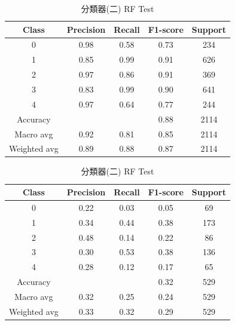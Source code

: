 \begin{enumerate}
\begin{enumerate}
                \begin{table}[H]
                \centering
                \scriptsize
                \begin{minipage}{0.48\textwidth}
                \centering
                \begin{tabular}{c|cccc}
                \hline
                Class & Precision & Recall & F1-score & Support \\
                \hline
                0 & 0.98 & 0.58 & 0.73 & 234 \\
                1 & 0.85 & 0.99 & 0.91 & 626 \\
                2 & 0.97 & 0.86 & 0.91 & 369 \\
                3 & 0.83 & 0.99 & 0.90 & 641 \\
                4 & 0.97 & 0.64 & 0.77 & 244 \\
                \hline
                Accuracy &       &       & 0.88 & 2114 \\
                Macro avg & 0.92 & 0.81 & 0.85 & 2114 \\
                Weighted avg & 0.89 & 0.88 & 0.87 & 2114 \\
                \hline
                \end{tabular}
                \caption{分類器(二) RF Train}
                \label{tab:classifier_2_report_train_sgd_rf_non_filtered}
                \end{minipage}%
                \hfill
                \begin{minipage}{0.48\textwidth}
                \centering
                \begin{tabular}{c|cccc}
                \hline
                Class & Precision & Recall & F1-score & Support \\
                \hline
                0 & 0.22 & 0.03 & 0.05 & 69 \\
                1 & 0.34 & 0.44 & 0.38 & 173 \\
                2 & 0.48 & 0.14 & 0.22 & 86 \\
                3 & 0.30 & 0.53 & 0.38 & 136 \\
                4 & 0.28 & 0.12 & 0.17 & 65 \\
                \hline
                Accuracy &       &       & 0.32 & 529 \\
                Macro avg & 0.32 & 0.25 & 0.24 & 529 \\
                Weighted avg & 0.33 & 0.32 & 0.29 & 529 \\
                \hline
                \end{tabular}
                \caption{分類器(二) RF Test}
                \label{tab:classifier_2_report_test_sgd_rf_non_filtered}
                \end{minipage}
                \end{table}



\end{enumerate}
\end{enumerate}
